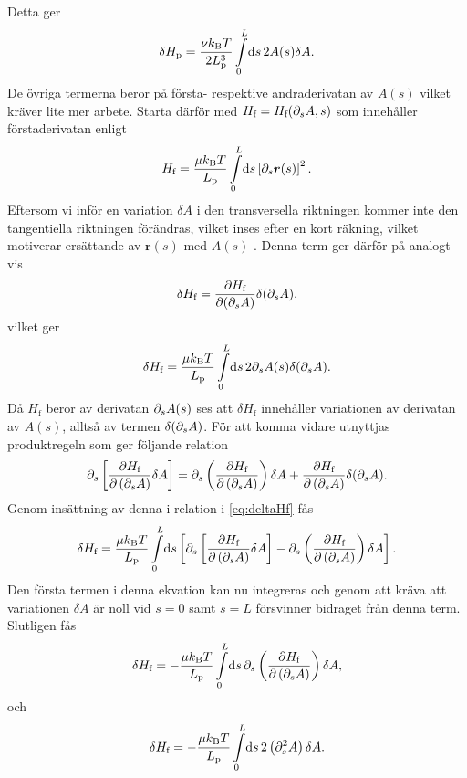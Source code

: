 Detta ger 
\begin{equation}
    \delta H_{\text{p}} = \frac{\nu\kbT}{2L_\text{p}^3}\int_0^L\!\dd{s} 2A(s)\delta A.
\end{equation}
De övriga termerna beror på första- respektive andraderivatan av $A(s)$ vilket kräver lite mer arbete. Starta därför med $H_{\text{f}}=H_{\text{f}}(\partial_sA,s)$ som innehåller förstaderivatan enligt
\begin{equation}
    H_{\text{f}} = \frac{\mu\kbT}{L_\text{p}}\int_0^L\!\dd{s}\left[\pd_s \mathbf{r}(s)\right]^2.
\end{equation}
Eftersom vi inför en variation $\delta A$ i den transversella riktningen kommer inte den tangentiella riktningen förändras, vilket inses efter en kort räkning, vilket motiverar ersättande av $\mathbf{r}(s)$ med $A(s)$ . Denna term ger därför på analogt vis 
\begin{equation}
    \delta H_{\text{f}} = \frac{\partial H_{\text{f}}}{\partial (\partial_s A)}\delta(\partial_sA),
\end{equation}
vilket ger 
\begin{equation}
    \label{eq:deltaHf}
    \delta H_{\text{f}} =  \frac{\mu\kbT}{L_\text{p}}\int_0^L\!\dd{s} 2\pd_sA(s)\delta (\pd_s A).
\end{equation}
Då $H_{\text{f}}$ beror av derivatan $\partial_sA(s)$ ses att $\delta H_{\text{f}}$ innehåller variationen av derivatan av $A(s)$, alltså av termen $\delta (\partial_sA)$. För att komma vidare utnyttjas produktregeln som ger följande relation 
\begin{equation}
    \partial_s\left[\frac{\partial H_{\text{f}}}{\partial \left(\partial_sA\right)}\delta A\right] = \partial_s\left(\frac{\partial H_{\text{f}}}{\partial \left(\partial_sA\right)}\right)\delta A+\frac{\partial H_{\text{f}}}{\partial \left(\partial_sA\right)}\delta(\partial_sA).
\end{equation}
Genom insättning av denna i relation i \eqref{eq:deltaHf} fås 
\begin{equation}
    \delta H_{\text{f}} = \frac{\mu\kbT}{L_\text{p}}\int_0^L\!\dd{s} \left[\pd_s\left[\frac{\pd H_{\text{f}}}{\pd \left(\pd_sA\right)}\delta A\right]-\pd_s\left(\frac{\pd H_{\text{f}}}{\pd \left(\pd_sA\right)}\right)\delta A \right].
\end{equation}
Den första termen i denna ekvation kan nu integreras och genom att kräva att variationen $\delta A$ är noll vid $s=0$ samt $s=L$ försvinner bidraget från denna term. Slutligen fås 
\begin{equation}
    \delta H_{\text{f}} = -\frac{\mu\kbT}{L_\text{p}}\int_0^L\!\dd{s} \pd_s\left(\frac{\pd H_{\text{f}}}{\pd \left(\pd_sA\right)}\right)\delta A,
\end{equation}
och 
\begin{equation}
     \delta H_{\text{f}} = -\frac{\mu\kbT}{L_\text{p}}\int_0^L\!\dd{s} 2\left(\pd_s^2A\right)\delta A.
\end{equation}

